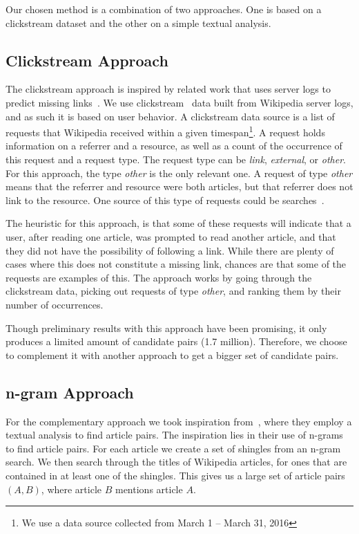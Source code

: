 Our chosen method is a combination of two approaches. One is based on a clickstream dataset and the other on a simple textual analysis.

\subsection{Clickstream Approach}

The clickstream approach is inspired by related work that uses server logs to predict missing links~\cite{hyperlink-structure-using-logs}. We use clickstream~\cite{wiki-clickstream} data built from Wikipedia server logs, and as such it is based on user behavior. A clickstream data source is a list of requests that Wikipedia received within a given timespan\footnote{We use a data source collected from March 1 -- March 31, 2016}. A request holds information on a referrer and a resource, as well as a count of the occurrence of this request and a request type. The request type can be \emph{link}, \emph{external}, or \emph{other}. For this approach, the type \emph{other} is the only relevant one. A request of type \emph{other} means that the referrer and resource were both articles, but that referrer does not link to the resource. One source of this type of requests could be searches~\cite{wiki-clickstream}.

The heuristic for this approach, is that some of these requests will indicate that a user, after reading one article, was prompted to read another article, and that they did not have the possibility of following a link. While there are plenty of cases where this does not constitute a missing link, chances are that some of the requests are examples of this. The approach works by going through the clickstream data, picking out requests of type \emph{other}, and ranking them by their number of occurrences.

Though preliminary results with this approach have been promising, it only produces a limited amount of candidate pairs (1.7 million). Therefore, we choose to complement it with another approach to get a bigger set of candidate pairs.

\subsection{n-gram Approach}

For the complementary approach we took inspiration from~\cite{milne2008learning}, where they employ a textual analysis to find article pairs. The inspiration lies in their use of n-grams to find article pairs. For each article we create a set of shingles from an n-gram search. We then search through the titles of Wikipedia articles, for ones that are contained in at least one of the shingles. This gives us a large set of article pairs $(A,B)$, where article $B$ mentions article $A$.

